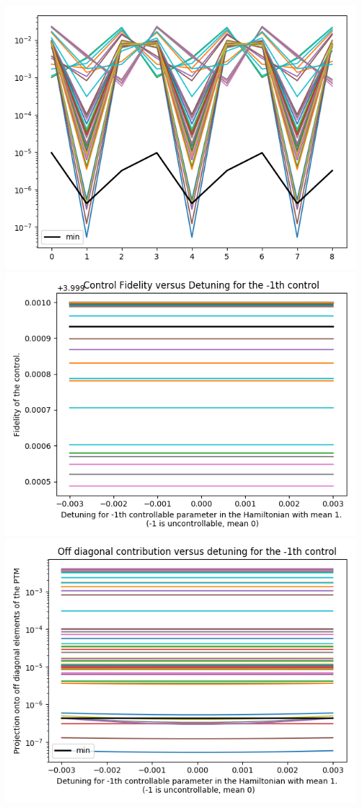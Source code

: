 \documentclass{article}
\begin{document}
\begin{center}
\includegraphics[scale=.9]{report_pickled_controls19/control_dpn_all}
\includegraphics[scale=.9]{control_fid_0}
\includegraphics[scale=.9]{off_diag_0}

\end{center}
\end{document}
